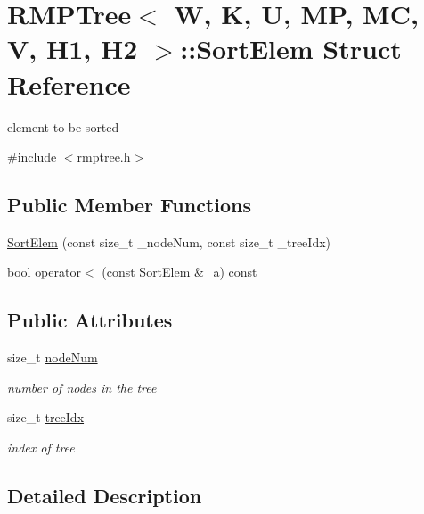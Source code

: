 \hypertarget{structRMPTree_1_1SortElem}{\section{R\-M\-P\-Tree$<$ W, K, U, M\-P, M\-C, V, H1, H2 $>$\-:\-:Sort\-Elem Struct Reference}
\label{structRMPTree_1_1SortElem}
}


element to be sorted  




{\ttfamily \#include $<$rmptree.\-h$>$}

\subsection*{Public Member Functions}
\begin{DoxyCompactItemize}
\item 
\hyperlink{structRMPTree_1_1SortElem_a80af01ad86c3dd77e5da55cb4b9ad811}{Sort\-Elem} (const size\-\_\-t \-\_\-node\-Num, const size\-\_\-t \-\_\-tree\-Idx)
\item 
bool \hyperlink{structRMPTree_1_1SortElem_a254fe720289135ee05307132c9ef6ad4}{operator$<$} (const \hyperlink{structRMPTree_1_1SortElem}{Sort\-Elem} \&\-\_\-a) const 
\end{DoxyCompactItemize}
\subsection*{Public Attributes}
\begin{DoxyCompactItemize}
\item 
size\-\_\-t \hyperlink{structRMPTree_1_1SortElem_a3aed6d248ebce90132ea23218bd9fd53}{node\-Num}
\begin{DoxyCompactList}\small\item\em number of nodes in the tree \end{DoxyCompactList}\item 
size\-\_\-t \hyperlink{structRMPTree_1_1SortElem_aa5217368661cb5c31474587ab41a71cd}{tree\-Idx}
\begin{DoxyCompactList}\small\item\em index of tree \end{DoxyCompactList}\end{DoxyCompactItemize}


\subsection{Detailed Description}
